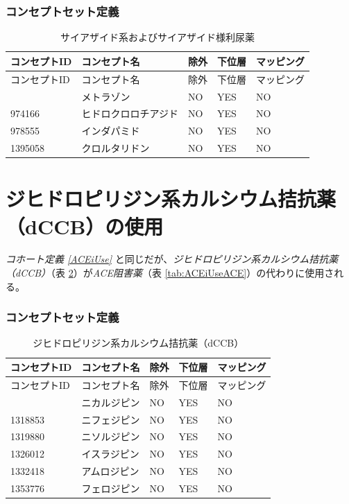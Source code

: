 \documentclass[
  11pt]{book}
\theoremstyle{definition}
\theoremstyle{definition}
\theoremstyle{definition}
\theoremstyle{definition}
\theoremstyle{remark}
\begin{document}
\subsubsection*{コンセプトセット定義}\label{ux30b3ux30f3ux30bbux30d7ux30c8ux30bbux30c3ux30c8ux5b9aux7fa9-6}

\begin{longtable}[]{@{}lllll@{}}
\caption{\label{tab:THZUseTHZ} サイアザイド系およびサイアザイド様利尿薬}\tabularnewline
\toprule\noalign{}
コンセプトID & コンセプト名 & 除外 & 下位層 & マッピング \\
\midrule\noalign{}
\endfirsthead
\toprule\noalign{}
コンセプトID & コンセプト名 & 除外 & 下位層 & マッピング \\
\midrule\noalign{}
\endhead
\bottomrule\noalign{}
\endlastfoot
907013 & メトラゾン & NO & YES & NO \\
974166 & ヒドロクロロチアジド & NO & YES & NO \\
978555 & インダパミド & NO & YES & NO \\
1395058 & クロルタリドン & NO & YES & NO \\
\end{longtable}

\section{ジヒドロピリジン系カルシウム拮抗薬（dCCB）の使用}\label{dCCBUse}

\emph{コホート定義 \ref{ACEiUse}} と同じだが、\emph{ジヒドロピリジン系カルシウム拮抗薬（dCCB）}（表 \ref{tab:dCCBUsedCBB}）が\emph{ACE阻害薬}（表 \ref{tab:ACEiUseACE}）の代わりに使用される。

\subsubsection*{コンセプトセット定義}\label{ux30b3ux30f3ux30bbux30d7ux30c8ux30bbux30c3ux30c8ux5b9aux7fa9-7}

\begin{longtable}[]{@{}lllll@{}}
\caption{\label{tab:dCCBUsedCBB} ジヒドロピリジン系カルシウム拮抗薬（dCCB）}\tabularnewline
\toprule\noalign{}
コンセプトID & コンセプト名 & 除外 & 下位層 & マッピング \\
\midrule\noalign{}
\endfirsthead
\toprule\noalign{}
コンセプトID & コンセプト名 & 除外 & 下位層 & マッピング \\
\midrule\noalign{}
\endhead
\bottomrule\noalign{}
\endlastfoot
1318137 & ニカルジピン & NO & YES & NO \\
1318853 & ニフェジピン & NO & YES & NO \\
1319880 & ニソルジピン & NO & YES & NO \\
1326012 & イスラジピン & NO & YES & NO \\
1332418 & アムロジピン & NO & YES & NO \\
1353776 & フェロジピン & NO & YES & NO \\
\end{longtable}
\end{document}
